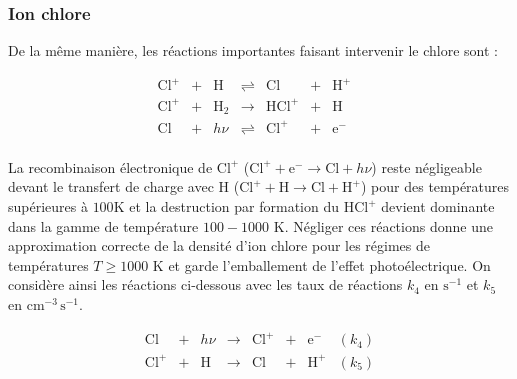 


\subsubsection{Ion chlore}

De la même manière, les réactions importantes faisant intervenir le chlore sont :

\begin{equation}\label{eq:sysCl}
    \begin{array}{lllllllr}
        \mathrm{Cl}^+ & + &\mathrm{H}   & \rightleftharpoons &\mathrm{Cl}  & + & \mathrm{H}^+ &   \\
        \mathrm{Cl}^+ & + &\mathrm{H_2}   & \rightarrow & \mathrm{HCl}^+ & + &  \mathrm{H}&  \\
       \mathrm{Cl}  & + & h\nu & \rightleftharpoons & \mathrm{Cl}^+ & + & \mathrm{e}^- &  \\
    \end{array}
\end{equation}


La recombinaison électronique de $\mathrm{Cl}^+$ ($\mathrm{Cl}^+ + \mathrm{e}^-\rightarrow  \mathrm{Cl} + h\nu $) reste négligeable devant le transfert de charge avec $\mathrm{H}$  ($\mathrm{Cl}^+ + \mathrm{H} \rightarrow \mathrm{Cl}+ \mathrm{H}^+ $) pour des températures supérieures à $100$K et la destruction par formation du $\mathrm{HCl}^+$ devient dominante dans la gamme de température $100-1000$ K. Négliger ces réactions donne une approximation correcte de la densité d'ion chlore pour les régimes de températures $T\geq 1000$ K et garde l'emballement de l'effet photoélectrique. On considère ainsi les réactions ci-dessous avec les taux de réactions $k_4$ en $\mathrm{s}^{-1}$ et $k_5$ en $\mathrm{cm}^{-3}\,\mathrm{s}^{-1}$.

\begin{equation}
    \begin{array}{lccccclr}
       \mathrm{Cl}  & + & h\nu & \rightarrow & \mathrm{Cl}^+ & + & \mathrm{e}^- & (k_4) \\
        \mathrm{Cl}^+ & + &\mathrm{H}   & \rightarrow &\mathrm{Cl}  & + & \mathrm{H}^+ & (k_5) \\
    \end{array}
\end{equation}

